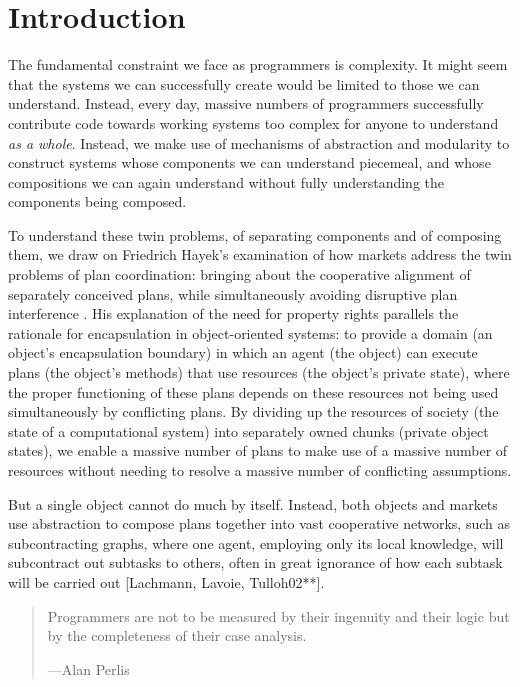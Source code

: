 \documentclass{llncs}
\begin{document}
\section{Introduction}

The fundamental constraint we face as programmers is complexity. It
might seem that the systems we can successfully create would be
limited to those we can understand. Instead, every day, massive
numbers of programmers successfully contribute code towards working
systems too complex for anyone to understand \emph{as a
whole}. Instead, we make use of mechanisms of abstraction and
modularity to construct systems whose components we can understand
piecemeal, and whose compositions we can again understand without
fully understanding the components being composed.

To understand these twin problems, of separating components and of
composing them, we draw on Friedrich Hayek's examination of how
markets address the twin problems of plan coordination: bringing about
the cooperative alignment of separately conceived plans, while
simultaneously avoiding disruptive plan interference
\cite{Hayek:1945:UKS}. His explanation of the need for property rights
parallels the rationale for encapsulation in object-oriented systems:
to provide a domain (an object's encapsulation boundary) in which an
agent (the object) can execute plans (the object's methods) that use
resources (the object's private state), where the proper functioning
of these plans depends on these resources not being used
simultaneously by conflicting plans. By dividing up the resources of
society (the state of a computational system) into separately owned
chunks (private object states), we enable a massive number of plans to
make use of a massive number of resources without needing to resolve a
massive number of conflicting assumptions.

But a single object cannot do much by itself. Instead, both objects
and markets use abstraction to compose plans together into vast
cooperative networks, such as subcontracting graphs, where one agent,
employing only its local knowledge, will subcontract out subtasks to
others, often in great ignorance of how each subtask will be carried
out [Lachmann, Lavoie, Tulloh02**].

\begin{quotation}
Programmers are not to be measured by their ingenuity and their logic
but by the completeness of their case analysis.
\begin{flushright}
---Alan Perlis
\end{flushright}
\end{quotation}
\end{document}
